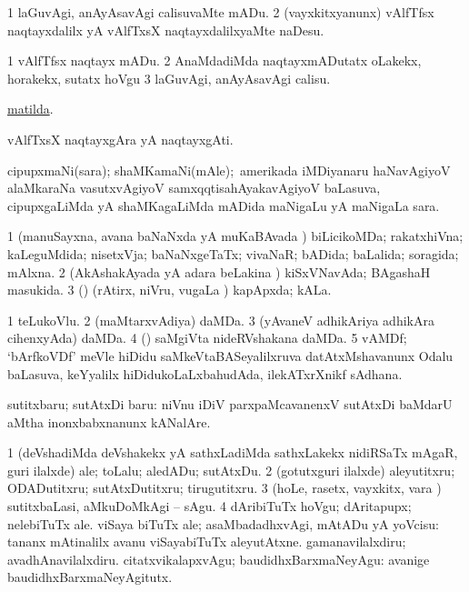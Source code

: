 \bentry
{} 
\gl{\sakirx}
\expl{}
\bmng
\bnum
\num{1} laGuvAgi, anAyAsavAgi calisuvaMte mADu. 
\num{2} (vayxkitxyanunx) vAlfTfsx naqtayxdalilx yA vAlfTxsX naqtayxdalilxyaMte naDesu. 
\enum
\emng

\noindent 
\gl{\akirx}
\expl{}
\bmng
\bnum
\num{1} vAlfTfsx naqtayx mADu. 
\num{2} AnaMdadiMda naqtayxmADutatx oLakekx, horakekx, sutatx hoVgu 
\num{3} laGuvAgi, anAyAsavAgi calisu. 
\enum
\emng

\noindent 
\gl{\pagu}
\expl{}
\bmng
{} \hyperref{kandict_m.pdf}{M}{Matilda}{matilda}. 
\emng
\eentry

\bentry
{} 
\gl{\nA}
\expl{}
\bmng
vAlfTxsX naqtayxgAra yA naqtayxgAti. 
\emng
\eentry

\bentry
{} 
\gl{\nA}
\expl{}
\bmng
cipupxmaNi(sara); shaMKamaNi(mAle);\kanu\ amerikada iMDiyanaru haNavAgiyoV alaMkaraNa vasutxvAgiyoV samxqqtisahAyakavAgiyoV baLasuva, cipupxgaLiMda yA shaMKagaLiMda mADida maNigaLu yA maNigaLa sara. 
\emng
\eentry

\bentry
{} 
\gl{\gu}
\expl{}
\bmng
\bnum
\num{1} (manuSayxna, avana baNaNxda yA muKaBAvada \vi) biLicikoMDa; rakatxhiVna; kaLeguMdida; nisetxVja; baNaNxgeTaTx; vivaNaR; bADida; baLalida; soragida; mAlxna. 
\num{2} (AkAshakAyada yA adara beLakina \vi) kiSxVNavAda; BAgashaH masukida. 
\num{3} (\pArxparx) (rAtirx, niVru, \mo vugaLa \vi) kapApxda; kALa. 
\enum
\emng
\eentry

\bentry
{} 
\gl{\nA}
\expl{}
\bmng
\bnum
\num{1} teLukoVlu. 
\num{2} (maMtarxvAdiya) daMDa. 
\num{3} (yAvaneV adhikAriya adhikAra cihenxyAda) daMDa. 
\num{4} (\AmA) saMgiVta nideRVshakana daMDa. 
\num{5} vAMDf; `bArfkoVDf' meVle hiDidu saMkeVtaBASeyalilxruva  datAtxMshavanunx Odalu baLasuva, keYyalilx hiDidukoLaLxbahudAda, ilekATxrXnikf sAdhana. 
\enum
\emng
\eentry

\bentry
{} 
\gl{\sakirx}
\expl{}
\bmng
sutitxbaru; sutAtxDi baru:  niVnu iDiV parxpaMcavanenxV sutAtxDi baMdarU aMtha inonxbabxnanunx kANalAre. 
\emng

\noindent 
\gl{\akirx}
\expl{}
\bmng
\bnum
\num{1} (deVshadiMda deVshakekx yA sathxLadiMda sathxLakekx nidiRSaTx mAgaR, guri ilalxde) ale; toLalu; aledADu; sutAtxDu. 
\num{2} (gotutxguri ilalxde) aleyutitxru; ODADutitxru; sutAtxDutitxru; tirugutitxru. 
\num{3} (hoLe, rasetx, vayxkitx, \mo vara \vi) sutitxbaLasi, aMkuDoMkAgi -- sAgu. 
\num{4} dAribiTuTx hoVgu; dAritapupx; nelebiTuTx ale. 
\banum
{} viSaya biTuTx ale; asaMbadadhxvAgi, mAtADu yA yoVcisu:  tananx mAtinalilx avanu viSayabiTuTx aleyutAtxne. 
 gamanavilalxdiru; avadhAnavilalxdiru. 
 citatxvikalapxvAgu; baudidhxBarxmaNeyAgu:  avanige baudidhxBarxmaNeyAgitutx. 
\eanum
\numie
\enum
\emng
\eentry


